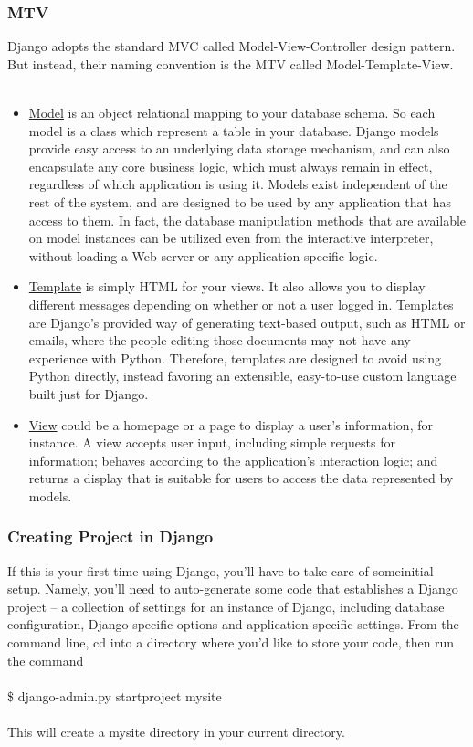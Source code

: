 \noindent \subsubsection{MTV} Django adopts the standard 
MVC called Model-View-Controller design pattern. But instead, their naming 
convention is the MTV called Model-Template-View.\\\\
\begin{itemize}
\item \underline {Model} is an object relational mapping to your 
database schema. So each model is a class which represent a table in 
your database. Django models provide easy access to an underlying data 
storage mechanism, and can also encapsulate any core business logic, 
which must always remain in effect, regardless of which application is 
using it. Models exist independent of the rest of the system, and are 
designed to be used by any application that has access to them. In 
fact, the database manipulation methods that are available on model 
instances can be utilized even from the interactive interpreter, 
without loading a Web server or any application-specific logic.

\item \underline {Template} is simply HTML for your views. It also 
allows you to display different messages depending on whether or not a 
user logged in. Templates are Django’s provided way of generating 
text-based output, such as HTML or emails, where the people editing 
those documents may not have any experience with Python. Therefore, 
templates are designed to avoid using Python directly, instead favoring 
an extensible, easy-to-use custom language built just for Django.

\item \underline {View} could be a homepage or a page to display a 
user's information, for instance. A view accepts user input, including 
simple requests for information; behaves according to the application’s 
interaction logic; and returns a display that is suitable for users to 
access the data represented by models.
\end{itemize}

\subsubsection{Creating Project in Django}
If this is your first time using Django, you’ll have to take care of 
someinitial setup. Namely, you’ll need to auto-generate some code that 
establishes a Django project – a collection of settings for an instance 
of Django, including database configuration, Django-specific options 
and application-specific settings. From the command line, cd into a 
directory where you’d like to store your code, then run the command \\\\
\$ django-admin.py startproject mysite\\\\
\noindent This will create a mysite directory in your current
directory.

